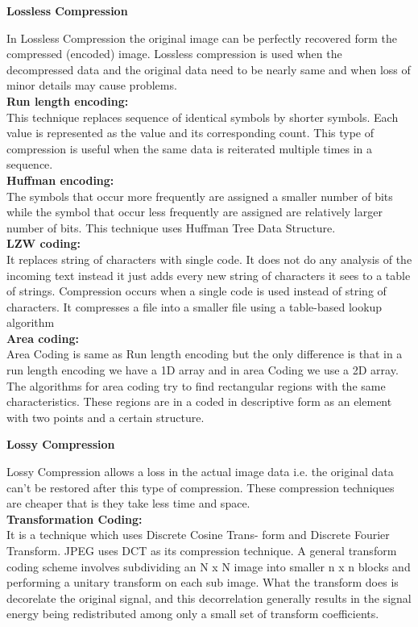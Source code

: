 \documentclass[10pt,a4paper]{article}
\begin{document}
\begin{center}
\textbf{Lossless Compression}\\
\end{center}
In Lossless Compression the original image can be perfectly recovered form the compressed (encoded) image. Lossless compression is used when the decompressed data and the original data need to be nearly same and when loss of minor details may cause problems.\\ 
\textbf{Run length encoding:}\\ 
This technique replaces sequence of identical symbols by shorter symbols.  Each value is represented as the value and its corresponding count. This type of compression is useful when the same data is reiterated multiple times in a sequence.\\
\textbf{Huﬀman encoding:} \\
The symbols that occur more frequently are assigned a smaller number of bits while the symbol that occur less frequently are assigned are relatively larger number of bits. This technique uses Huﬀman Tree Data Structure.\\ 
\textbf{LZW coding:}\\ 
 It replaces string of characters with single code. It does not do any analysis of the incoming text instead it just adds every new string of characters it sees to a table of strings. Compression occurs when a single code is used instead of string of characters. It compresses a file into a smaller file using a table-based lookup algorithm\\
\textbf{Area coding:}\\
Area Coding is same as Run length encoding but the only diﬀerence is that in a run length encoding we have a 1D array and in area Coding we use a 2D array. The algorithms for area coding try to find rectangular regions with the same characteristics. These regions are in a coded in descriptive form as an element with two points and a certain structure.\\
\begin{center}
\textbf{Lossy Compression}
\end{center}
Lossy Compression allows a loss in the actual image data i.e. the original data can’t be restored after this type of compression. These compression techniques are cheaper that is they take less time and space.\\
\textbf{Transformation Coding:}\\
It is a technique which uses Discrete Cosine Trans- form and Discrete Fourier Transform. JPEG uses DCT as its compression technique. A general transform coding scheme involves subdividing an N x N image into smaller n x n blocks and performing a unitary transform on each sub image. What the transform does is decorelate the original signal, and this decorrelation generally results in the signal energy being redistributed among only a small set of transform coefficients.\\
\end{document}
